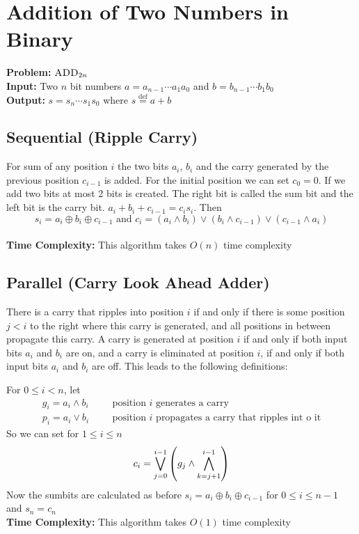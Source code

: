 \section{Addition of Two Numbers in Binary}
\textbf{Problem:} $\textsc{ADD}_{2n}$\\
\textbf{Input:} Two $n$ bit numbers $a=a_{n-1}\cdots a_1a_0$ and $b=b_{n-1}\cdots b_1b_0$\\
\textbf{Output:} $s=s_n\cdots s_1s_0$ where $s\overset{\text{def}}{=}a+b$\\

\subsection{Sequential (Ripple Carry)} For sum of any position $i$ the two bits $a_i$, $b_i$ and the carry generated by the previous position $c_{i-1}$ is added. For the initial position we can set $c_0=0$. If we add two bits at most 2 bits is created. The right bit is called the sum bit and the left bit is the carry bit. $a_i+b_i+c_{i-1}=c_is_i$. Then $$s_i=a_i\oplus b_i \oplus c_{i-1}\text{ and } c_i=(a_{i}\wedge b_{i})\vee (b_{i} \wedge c_{i-1}) \vee (c_{i-1} \wedge a_i)$$\\
\textbf{Time Complexity:} This algorithm takes $O(n)$ time complexity

\subsection{Parallel (Carry Look Ahead Adder)}
There is a carry that ripples into position $i$ if and only if there is some position $j < i$ to the right where this carry is generated, and all positions in between propagate this carry. A carry is generated at position $i$ if and only if both input bits $a_i$ and $b_i$ are on, and a carry is eliminated at position $i$, if and only if both input bits $a_i$ and $b_i$ are off. This leads to the following definitions: 

For $0 \leq  i < n$, let\begin{align*}
	g_i=a_i\wedge b_i &  &  & \text{position $i$ generates a carry}                        \\
	p_i=a_i\vee b_i   &  &  & \text{position $i$ propagates a carry that ripples int o it}
\end{align*}
So we can set for $1\leq i \leq n$ $$c_i=\bigvee_{j=0}^{i-1}\left( g_j\wedge \bigwedge_{k=j+1}^{i-1} \right)$$ Now the sumbits are calculated as before $s_i=a_i\oplus b_i \oplus c_{i-1}$ for $0\leq i\leq n-1$ and $s_n=c_n$\\
\textbf{Time Complexity:} This algorithm takes $O(1)$ time complexity


